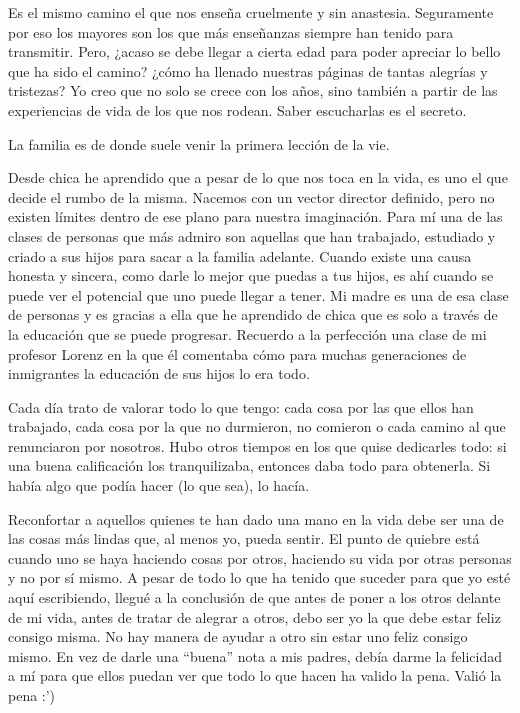 \documentclass[12t, a4 paper]{article}
\begin{document}
Es el mismo camino el que nos ense\~na cruelmente y sin anastesia. Seguramente por eso los mayores son los que m\'as ense\~nanzas siempre han tenido para transmitir. Pero, ¿acaso se debe llegar a cierta edad para poder apreciar lo bello que ha sido el camino? ¿c\'omo ha llenado nuestras p\'aginas de tantas alegr\'ias y tristezas? Yo creo que no solo se crece con los a\~nos, sino tambi\'en a partir de las experiencias de vida de los que nos rodean. Saber escucharlas es el secreto.

La familia es de donde suele venir la primera lecci\'on de la vie.

Desde chica he aprendido que a pesar de lo que nos toca en la vida, es uno el que decide el rumbo de la misma. Nacemos con un vector director definido, pero no existen l\'imites dentro de ese plano para nuestra imaginaci\'on. Para m\'i una de las clases de personas que m\'as admiro son aquellas que han trabajado, estudiado y criado a sus hijos para sacar a la familia adelante. Cuando existe una causa honesta y sincera, como darle lo mejor que puedas a tus hijos, es ah\'i cuando se puede ver el potencial que uno puede llegar a tener. Mi madre es una de esa clase de personas y es gracias a ella que he aprendido de chica que es solo a trav\'es de la educaci\'on que se puede progresar. Recuerdo a la perfecci\'on una clase de mi profesor Lorenz en la que \'el comentaba c\'omo para muchas generaciones de inmigrantes la educaci\'on de sus hijos lo era todo. 

Cada d\'ia trato de valorar todo lo que tengo: cada cosa por las que ellos han trabajado, cada cosa por la que no durmieron, no comieron o cada camino al que renunciaron por nosotros. Hubo otros tiempos en los que quise dedicarles todo: si una buena calificaci\'on los tranquilizaba, entonces daba todo para obtenerla. Si hab\'ia algo que pod\'ia hacer (lo que sea), lo hac\'ia. 

Reconfortar a aquellos quienes te han dado una mano en la vida debe ser una de las cosas m\'as lindas que, al menos yo, pueda sentir. El punto de quiebre est\'a cuando uno se haya haciendo cosas por otros, haciendo su vida por otras personas y no por s\'i mismo. A pesar de todo lo que ha tenido que suceder para que yo est\'e aqu\'i escribiendo, llegu\'e a la conclusi\'on de que antes de poner a los otros delante de mi vida, antes de tratar de alegrar a otros, debo ser yo la que debe estar feliz consigo misma. No hay manera de ayudar a otro sin estar uno feliz consigo mismo. En vez de darle una “buena” nota a mis padres, deb\'ia darme la felicidad a m\'i para que ellos puedan ver que todo lo que hacen ha valido la pena. Vali\'o la pena :’) 
\end{document}
